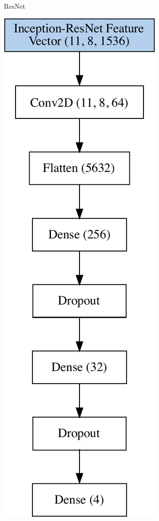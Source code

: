 \begin{figure}[h!]
\begin{subfigure}[b]{0.3\linewidth}
    \caption{ResNet} 
    \label{image-classification-model:resnet} 
    \vspace{2ex}
  \end{subfigure}%
   \begin{subfigure}[b]{0.3\linewidth}
    \centering
    \includegraphics[width=0.8\linewidth]{graphics/image-classification-results/model/inception.pdf} 

\end{subfigure}
\end{figure}
